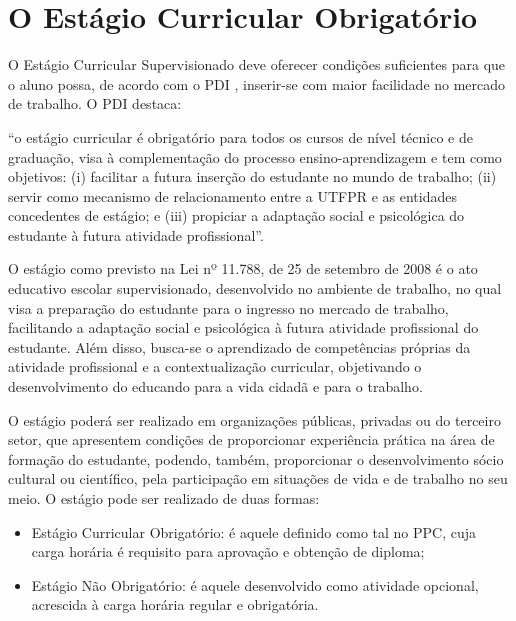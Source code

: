 \clearpage


\section{O Estágio Curricular Obrigatório}

O Estágio Curricular Supervisionado deve oferecer condições suficientes para que o aluno possa, de acordo com o PDI \cite{pdiutfpr}, inserir-se com maior facilidade no mercado de trabalho. O PDI destaca:

\begin{citacao}
	``o estágio curricular é obrigatório para todos os cursos de nível técnico e de graduação, visa à complementação do processo ensino-aprendizagem e tem como objetivos: (i) facilitar a futura inserção do estudante no mundo de trabalho; (ii) servir como mecanismo de relacionamento entre a UTFPR e as entidades concedentes de estágio; e (iii) propiciar a adaptação social e psicológica do estudante à futura atividade profissional''.
\end{citacao}


O estágio como previsto na Lei nº 11.788, de 25 de setembro de 2008 \cite{Lei:11788:2008} é o ato educativo escolar supervisionado, desenvolvido no ambiente de trabalho, no qual visa a preparação do estudante para o ingresso no mercado de trabalho, facilitando a adaptação social e psicológica à futura atividade profissional do estudante. Além disso, busca-se o aprendizado de competências próprias da atividade profissional e a contextualização curricular, objetivando o desenvolvimento do educando para a vida cidadã e para o trabalho.

O estágio poderá ser realizado em organizações públicas, privadas ou do terceiro setor, que apresentem condições de proporcionar experiência prática na área de formação do estudante, podendo, também, proporcionar o desenvolvimento sócio cultural ou científico, pela participação em situações de vida e de trabalho no seu meio. O estágio pode ser realizado de duas formas:

\begin{itemize}
	\item Estágio Curricular Obrigatório: é aquele definido como tal no PPC, cuja carga horária é requisito para aprovação e obtenção de diploma;
	\item Estágio Não Obrigatório: é aquele desenvolvido como atividade opcional, acrescida à carga horária regular e obrigatória.
\end{itemize}

